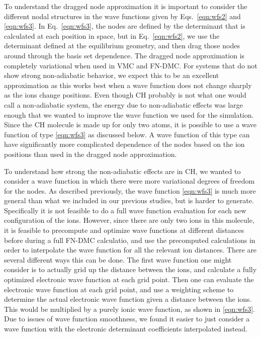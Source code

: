 \documentclass[aip,jcp,numerical,reprint]{revtex4-1}
\begin{document}
To understand the dragged node approximation  it is important to consider the different nodal structures in the wave functions given by Eqs.~\eqref{eqn:wfs2} and \eqref{eqn:wfs3}.  In Eq.~\eqref{eqn:wfs3}, the nodes are defined by the determinant that is calculated at each position in space, but in Eq.~\eqref{eqn:wfs2}, we use the determinant defined at the equilibrium geometry, and then drag those nodes around through the basis set dependence.   The dragged node approximation is completely variational when used in VMC and FN-DMC.  
For systems that do not show strong non-adiabatic behavior, we expect this to be an excellent approximation as this works best when a wave function does not change sharply as the ions change positions.   Even though CH probably is not what one would call a non-adiabatic system, the energy due to non-adiabatic effects was large enough that we wanted to improve the wave function we used for the simulation.    Since the CH molecule is made up for only two atoms, it is possible to use a wave function of type \eqref{eqn:wfs3} as discussed below.   A wave function of this type can have significantly more complicated dependence of the nodes based on the ion positions than used in the dragged node approximation.

To understand how strong the non-adiabatic effects are in CH, we wanted to consider a wave function in which there were more variational degrees of freedom for the nodes.  As described previously, the wave function \eqref{eqn:wfs3} is much more general than what we included in our previous studies, but is harder to generate.  Specifically it is not feasible to do a full wave function evaluation for each new configuration of the ions.  However, since there are only two ions in this molecule, it is feasible to precompute and optimize wave functions at different distances before during a full FN-DMC calculatio, and use the precomputed calculations in order to interpolate the wave function for all the relevant ion distances.  There are several different ways this can be done.   The first wave function one might consider is to actually grid up the distance between the ions, and calculate a fully optimized electronic wave function at each grid point.  Then one can evaluate the electronic wave function at each grid point, and use a weighting scheme to determine the actual electronic wave function given a distance between the ions.  This would be multiplied by a purely ionic wave function, as shown in \eqref{eqn:wfs3}.  Due to issues of wave function smoothness, we found it easier to just consider a wave function with the electronic determinant coefficients interpolated instead.
\end{document}
